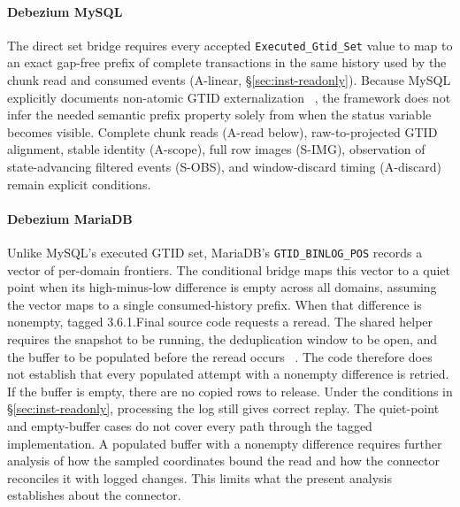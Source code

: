 \documentclass[sigconf,nonacm,10pt]{acmart}
\theoremstyle{plain}
\theoremstyle{definition}
\begin{document}
\paragraph{Debezium MySQL}
The direct set bridge requires every accepted
\texttt{Executed\_Gtid\_Set} value to map to an exact gap-free prefix
of complete transactions in the same history used by the chunk read
and consumed events (A-linear, \S\ref{sec:inst-readonly}). Because MySQL
explicitly documents non-atomic GTID externalization
~\cite{mysql_gtid_lifecycle}, the framework does not infer the
needed semantic prefix property solely from when the status variable
becomes visible. Complete chunk reads (A-read below), raw-to-projected
GTID alignment, stable identity (A-scope), full row images (S-IMG), observation of
state-advancing filtered events (S-OBS), and window-discard timing (A-discard)
remain explicit conditions.

\paragraph{Debezium MariaDB}
Unlike MySQL's executed GTID set, MariaDB's \texttt{GTID\_\allowbreak{}BINLOG\_\allowbreak{}POS} 
records a vector of per-domain frontiers. The conditional bridge maps this vector to a quiet 
point when its high-minus-low difference is empty across all domains, assuming the vector 
maps to a single consumed-history prefix. 
When that difference is nonempty, tagged 3.6.1.Final source code
requests a reread. The shared helper requires the snapshot to be
running, the deduplication window to be open, and the buffer to be
populated before the reread occurs
~\cite{debezium_mariadb_readonly_source,debezium_mysql_readonly_source}.
The code therefore does not establish that every populated attempt
with a nonempty difference is retried. If the buffer is empty, there
are no copied rows to release. Under the conditions in
\S\ref{sec:inst-readonly}, processing the log still gives correct replay.
The quiet-point and empty-buffer cases do not cover every path through
the tagged implementation. A populated buffer with a nonempty
difference requires further analysis of how the sampled coordinates
bound the read and how the connector reconciles it with logged changes.
This limits what the present analysis establishes about the connector.
\end{document}
